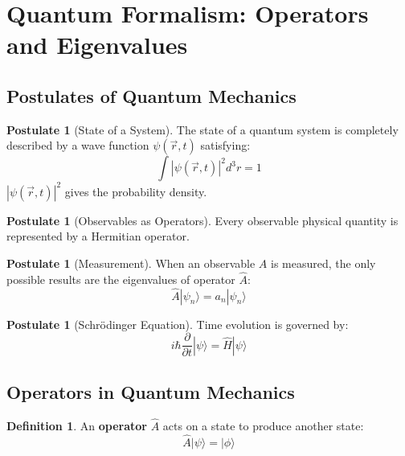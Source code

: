 \documentclass[12pt,a4paper]{article}
\theoremstyle{definition}
\newtheorem{definition}[theorem]{Definition}
\newtheorem{postulate}[theorem]{Postulate}
\begin{document}
\newpage
\section{Quantum Formalism: Operators and Eigenvalues}

\subsection{Postulates of Quantum Mechanics}

\begin{postulate}[State of a System]
The state of a quantum system is completely described by a wave function $\psi(\vec{r}, t)$ satisfying:
\[
\int |\psi(\vec{r}, t)|^2 d^3r = 1
\]
$|\psi(\vec{r}, t)|^2$ gives the probability density.
\end{postulate}

\begin{postulate}[Observables as Operators]
Every observable physical quantity is represented by a Hermitian operator.
\end{postulate}

\begin{postulate}[Measurement]
When an observable $A$ is measured, the only possible results are the eigenvalues of operator $\hat{A}$:
\[
\hat{A}|\psi_n\rangle = a_n|\psi_n\rangle
\]
\end{postulate}

\begin{postulate}[Schrödinger Equation]
Time evolution is governed by:
\[
i\hbar\frac{\partial}{\partial t}|\psi\rangle = \hat{H}|\psi\rangle
\]
\end{postulate}

\subsection{Operators in Quantum Mechanics}

\begin{definition}
An \textbf{operator} $\hat{A}$ acts on a state to produce another state:
\[
\hat{A}|\psi\rangle = |\phi\rangle
\]
\end{definition}
\end{document}
